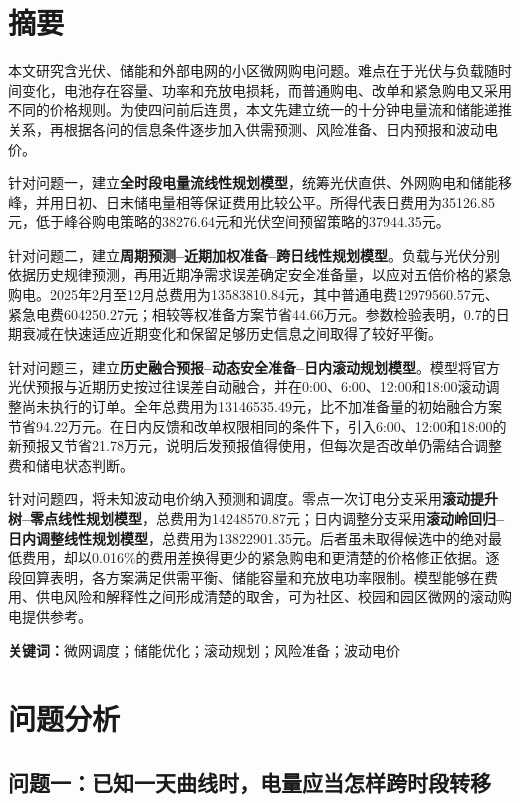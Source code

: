 \documentclass[11pt,a4paper]{article}
\begin{document}
\section*{摘\quad 要}

本文研究含光伏、储能和外部电网的小区微网购电问题。难点在于光伏与负载随时间变化，电池存在容量、功率和充放电损耗，而普通购电、改单和紧急购电又采用不同的价格规则。为使四问前后连贯，本文先建立统一的十分钟电量流和储能递推关系，再根据各问的信息条件逐步加入供需预测、风险准备、日内预报和波动电价。

针对问题一，建立\textbf{全时段电量流线性规划模型}，统筹光伏直供、外网购电和储能移峰，并用日初、日末储电量相等保证费用比较公平。所得代表日费用为35126.85元，低于峰谷购电策略的38276.64元和光伏空间预留策略的37944.35元。

针对问题二，建立\textbf{周期预测--近期加权准备--跨日线性规划模型}。负载与光伏分别依据历史规律预测，再用近期净需求误差确定安全准备量，以应对五倍价格的紧急购电。2025年2月至12月总费用为13583810.84元，其中普通电费12979560.57元、紧急电费604250.27元；相较等权准备方案节省44.66万元。参数检验表明，0.7的日期衰减在快速适应近期变化和保留足够历史信息之间取得了较好平衡。

针对问题三，建立\textbf{历史融合预报--动态安全准备--日内滚动规划模型}。模型将官方光伏预报与近期历史按过往误差自动融合，并在0:00、6:00、12:00和18:00滚动调整尚未执行的订单。全年总费用为13146535.49元，比不加准备量的初始融合方案节省94.22万元。在日内反馈和改单权限相同的条件下，引入6:00、12:00和18:00的新预报又节省21.78万元，说明后发预报值得使用，但每次是否改单仍需结合调整费和储电状态判断。

针对问题四，将未知波动电价纳入预测和调度。零点一次订电分支采用\textbf{滚动提升树--零点线性规划模型}，总费用为14248570.87元；日内调整分支采用\textbf{滚动岭回归--日内调整线性规划模型}，总费用为13822901.35元。后者虽未取得候选中的绝对最低费用，却以0.016\%的费用差换得更少的紧急购电和更清楚的价格修正依据。逐段回算表明，各方案满足供需平衡、储能容量和充放电功率限制。模型能够在费用、供电风险和解释性之间形成清楚的取舍，可为社区、校园和园区微网的滚动购电提供参考。

\noindent\textbf{关键词：}微网调度；储能优化；滚动规划；风险准备；波动电价

\newpage
\section{问题分析}

\subsection{问题一：已知一天曲线时，电量应当怎样跨时段转移}
\end{document}
